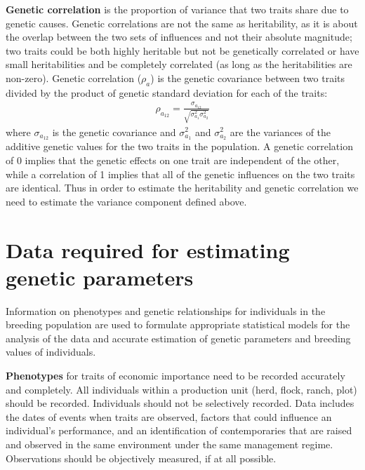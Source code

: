 \documentclass[
]{book}
\begin{document}
\textbf{Genetic correlation} is the proportion of variance that two traits share due to genetic causes. Genetic correlations are not the same as heritability, as it is about the overlap between the two sets of influences and not their absolute magnitude; two traits could be both highly heritable but not be genetically correlated or have small heritabilities and be completely correlated (as long as the heritabilities are non-zero).
Genetic correlation (\(\rho_a\)) is the genetic covariance between two traits divided by the product of genetic standard deviation for each of the traits:
\begin{align}
\rho_{a_{12}}=\frac{\sigma_{a_{12}}}{\sqrt{\sigma_{a_{1}}^2 \sigma_{a_{2}}^2}}
\end{align}
where \(\sigma_{a_{12}}\) is the genetic covariance and \(\sigma_{a_{1}}^2\) and \(\sigma_{a_{2}}^2\) are the variances of the additive genetic values for the two traits in the population.
A genetic correlation of 0 implies that the genetic effects on one trait are independent of the other, while a correlation of 1 implies that all of the genetic influences on the two traits are identical.
Thus in order to estimate the heritability and genetic correlation we need to estimate the variance component defined above.

\hypertarget{data-required-for-estimating-genetic-parameters}{%
\section{Data required for estimating genetic parameters}\label{data-required-for-estimating-genetic-parameters}}

Information on phenotypes and genetic relationships for individuals in the breeding population
are used to formulate appropriate statistical models for the analysis of the data
and accurate estimation of genetic parameters and breeding values of individuals.

\textbf{Phenotypes} for traits of economic importance need to be recorded accurately and completely. All individuals
within a production unit (herd, flock, ranch, plot) should be recorded. Individuals should not be
selectively recorded. Data includes the dates of events when traits are observed, factors
that could influence an individual's performance, and an identification of contemporaries that
are raised and observed in the same environment under the same management regime.
Observations should be objectively measured, if at all possible.
\end{document}

